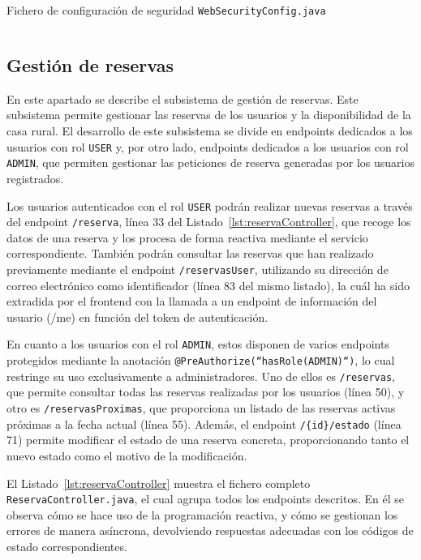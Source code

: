 \begin{longlisting}
    \caption{Fichero de configuración de seguridad {\tt WebSecurityConfig.java}}
    \inputminted[highlightlines={75-82,98}, firstline=36, lastline=111]{java}{../backend/elrincondeeva/elrincondeeva/src/main/java/es/uv/hemal/elrincondeeva/config/WebSecurityConfig.java}
    \label{lst:jwt}
\end{longlisting}

\subsection{Gestión de reservas}
En este apartado se describe el subsistema de gestión de reservas. Este subsistema permite gestionar las reservas de los usuarios y la disponibilidad de la casa rural. El desarrollo de este subsistema se divide en endpoints dedicados a los usuarios con rol \texttt{USER} y, por otro lado, endpoints dedicados a los usuarios con rol \texttt{ADMIN}, que permiten gestionar las peticiones de reserva generadas por los usuarios registrados.

Los usuarios autenticados con el rol \texttt{USER} podrán realizar nuevas reservas a través del endpoint \texttt{/reserva}, línea 33 del Listado~\ref{lst:reservaController}, que recoge los datos de una reserva y los procesa de forma reactiva mediante el servicio correspondiente. También podrán consultar las reservas que han realizado previamente mediante el endpoint \texttt{/reservasUser}, utilizando su dirección de correo electrónico como identificador (línea 83 del mismo listado), la cuál ha sido extradida por el \gls{frontend} con la llamada a un endpoint de información del usuario (/me) en función del token de autenticación.

En cuanto a los usuarios con el rol \texttt{ADMIN}, estos disponen de varios endpoints protegidos mediante la anotación \texttt{@PreAuthorize(``hasRole(ADMIN)``)}, lo cual restringe su uso exclusivamente a administradores. Uno de ellos es \texttt{/reservas}, que permite consultar todas las reservas realizadas por los usuarios (línea 50), y otro es \texttt{/reservasProximas}, que proporciona un listado de las reservas activas próximas a la fecha actual (línea 55). Además, el endpoint \texttt{/\{id\}/estado} (línea 71) permite modificar el estado de una reserva concreta, proporcionando tanto el nuevo estado como el motivo de la modificación.

El Listado~\ref{lst:reservaController} muestra el fichero completo \texttt{ReservaController.java}, el cual agrupa todos los endpoints descritos. En él se observa cómo se hace uso de la programación reactiva, y cómo se gestionan los errores de manera asíncrona, devolviendo respuestas adecuadas con los códigos de estado correspondientes.

